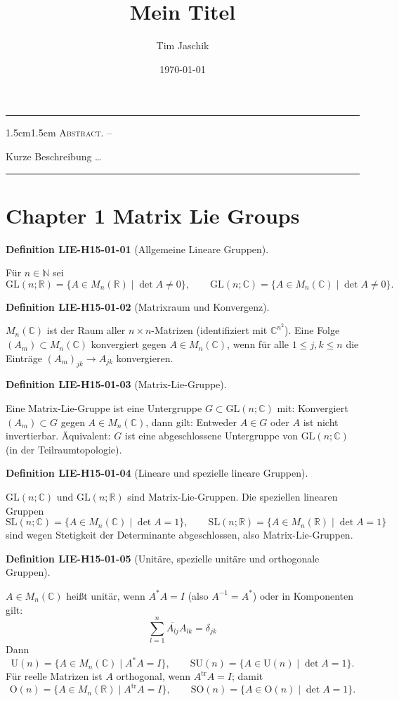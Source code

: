 \documentclass[10pt, letterpaper]{article}
\title{Mein Titel}
\author{Tim Jaschik}
\date{\today}
\newcommand{\R}{\mathbb{R}}
\newcommand{\C}{\mathbb{C}}
\newcommand{\GL}{\mathrm{GL}}
\newcommand{\SL}{\mathrm{SL}}
\newcommand{\SO}{\mathrm{SO}}
\newcommand{\SU}{\mathrm{SU}}
\newcommand{\Ogroup}{\mathrm{O}} %
\newcommand{\U}{\mathrm{U}}
\renewenvironment{abstract}
  {
    \begin{adjustwidth}{1.5cm}{1.5cm}
    \small
    \textsc{Abstract. –}%
  }
  {
    \end{adjustwidth}
  }
\newcommand{\CustomHeading}[3]{%
  \par\medskip\noindent%
  \textbf{#1 #2} \textnormal{(#3)}.\enskip%
}
\newenvironment{DEF}[2]{\begin{unitbox}\CustomHeading{Definition}{#1}{#2}}{\end{unitbox}}
\begin{document}
\maketitle
\rule{\textwidth}{0.5pt}
\begin{abstract}
Kurze Beschreibung …
\end{abstract}
\rule{\textwidth}{0.5pt}
\vspace{0.5cm}

\tableofcontents

\pagebreak

\section*{Chapter 1 Matrix Lie Groups}



\begin{DEF}{LIE-H15-01-01}{Allgemeine Lineare Gruppen}
Für $n\in\mathbb{N}$ sei
\[
\GL(n;\R)=\{A\in M_n(\R)\mid \det A\neq 0\},\qquad
\GL(n;\C)=\{A\in M_n(\C)\mid \det A\neq 0\}.
\]
\end{DEF}


\begin{DEF}{LIE-H15-01-02}{Matrixraum und Konvergenz}
$M_n(\C)$ ist der Raum aller $n\times n$-Matrizen (identifiziert mit $\C^{n^2}$).
Eine Folge $(A_m)\subset M_n(\C)$ konvergiert gegen $A\in M_n(\C)$, wenn für alle $1\le j,k\le n$ die Einträge $(A_m)_{jk}\to A_{jk}$ konvergieren.
\end{DEF}


\begin{DEF}{LIE-H15-01-03}{Matrix-Lie-Gruppe}
Eine Matrix-Lie-Gruppe ist eine Untergruppe $G\subset \GL(n;\C)$ mit:
Konvergiert $(A_m)\subset G$ gegen $A\in M_n(\C)$, dann gilt: Entweder $A\in G$ oder $A$ ist nicht invertierbar.
Äquivalent: $G$ ist eine abgeschlossene Untergruppe von $\GL(n;\C)$ (in der Teilraumtopologie).
\end{DEF}


\begin{DEF}{LIE-H15-01-04}{Lineare und spezielle lineare Gruppen}
$\GL(n;\C)$ und $\GL(n;\R)$ sind Matrix-Lie-Gruppen.
Die speziellen linearen Gruppen
\[
\SL(n;\C)=\{A\in M_n(\C)\mid \det A=1\},\qquad
\SL(n;\R)=\{A\in M_n(\R)\mid \det A=1\}
\]
sind wegen Stetigkeit der Determinante abgeschlossen, also Matrix-Lie-Gruppen.
\end{DEF}


\begin{DEF}{LIE-H15-01-05}{Unitäre, spezielle unitäre und orthogonale Gruppen}
$A\in M_n(\C)$ heißt unitär, wenn $A^*A=I$ (also $A^{-1}=A^*$) oder in Komponenten gilt:
$$
\sum_{l=1}^{n} \overline{A_{l j}} A_{l k}=\delta_{j k}
$$
Dann
\[
\U(n)=\{A\in M_n(\C)\mid A^*A=I\},\qquad
\SU(n)=\{A\in \U(n)\mid \det A=1\}.
\]
Für reelle Matrizen ist $A$ orthogonal, wenn $A^{\mathrm{tr}}A=I$; damit
\[
\Ogroup(n)=\{A\in M_n(\R)\mid A^{\mathrm{tr}}A=I\},\qquad
\SO(n)=\{A\in \Ogroup (n)\mid \det A=1\}.
\]
\end{DEF}
\end{document}
